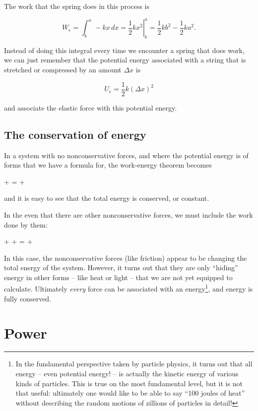 \documentclass[10pt]{article}
\begin{document}
The work that the spring does in this process is 

$$W_e = \int_b^a\, -kx\, dx = \left.\frac{1}{2}kx^2\right|_b^a =\frac{1}{2}kb^2 - \frac{1}{2}ka^2.$$

Instead of doing this integral every time we encounter a spring that does work, we can just remember that the potential energy associated with a string that is stretched or compressed by an amount $\Delta x$ is 

$$U_e = \frac{1}{2}k(\Delta x)^2$$

and associate the elastic force with this potential energy.

\subsection{The conservation of energy}

In a system with no nonconservative forces, and where the potential energy is of forms that we have a formula for, the work-energy theorem becomes

 +   =  + 

and it is easy to see that the total energy is conserved, or constant.

In the even that there are other nonconservative forces, we must include the work done by them:

 +  + =  + 

In this case, the nonconservative forces (like friction) appear to be changing the total energy of the system. However, it turns out that they are only ``hiding'' energy in other forms -- like heat or light -- that we are not yet equipped to calculate. Ultimately {\it every} force can be associated with an energy\footnote{In the fundamental perspective taken by particle physics, it turns out that all energy -- even potential energy! -- is actually the kinetic energy of various kinds of particles. This is true on  the most fundamental level, but it is not that useful: ultimately one would like to be able to say ``100 joules of heat'' without describing the random motions of zillions of particles in detail!}, and energy is fully conserved.

\section{Power}
\end{document}
